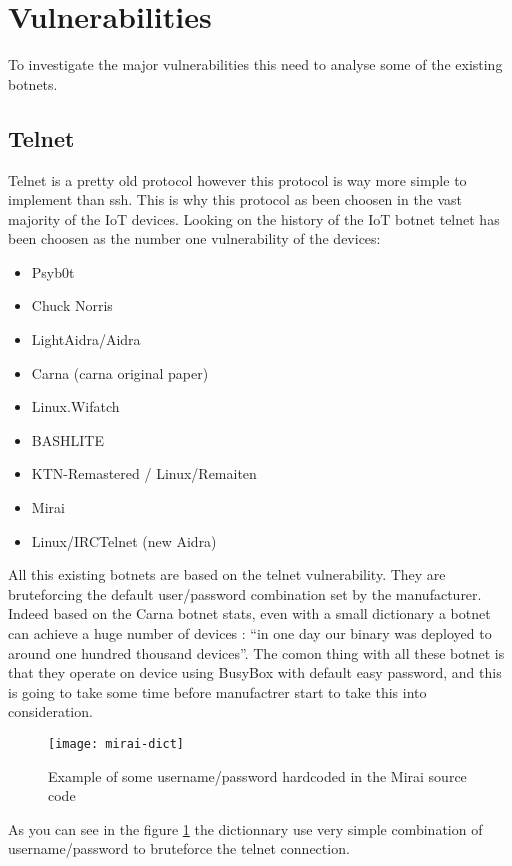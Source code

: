\documentclass{report}
\begin{document}
\section{Vulnerabilities}
To investigate the major vulnerabilities this need to analyse some of the existing botnets.

\subsection{Telnet}
Telnet is a pretty old protocol\autocite{davidson1977arpanet} however this protocol is way more simple to implement than ssh. This is why this protocol as been choosen in the vast majority of the IoT devices. Looking on the history of the IoT botnet telnet has been choosen as the number one vulnerability of the devices:

\begin{itemize}
 \item Psyb0t\autocite{durfina2013psybot}
 \item Chuck Norris\autocite{celeda2010embedded}
 \item LightAidra/Aidra\autocite{aidra}
 \item Carna\autocite{krenc2014internet} (carna original paper\autocite{carna})
 \item Linux.Wifatch\autocite{wifatch}
 \item BASHLITE\autocite{bashlite}
 \item KTN-Remastered / Linux/Remaiten\autocite{remaiten}
 \item Mirai\autocite{kolias2017ddos}
 \item Linux/IRCTelnet (new Aidra)\autocite{irctelnet}
\end{itemize}

All this existing botnets are based on the telnet vulnerability. They are bruteforcing the default user/password combination set by the manufacturer. Indeed based on the Carna botnet\autocite{carna} stats, even with a small dictionary a botnet can achieve a huge number of devices : ``in one day our binary was deployed to around one hundred thousand devices''.
The comon thing with all these botnet is that they operate on device using BusyBox with default easy password, and this is going to take some time before manufactrer start to take this into consideration.\newline
\begin{figure}[h]
 \caption{Example of some username/password hardcoded in the Mirai source code}
 \centering
 \texttt{[image: mirai-dict]}
 \label{fig:mirai-dict}
\end{figure}
As you can see in the figure \ref{fig:mirai-dict} the dictionnary use very simple combination of username/password to bruteforce the telnet connection.
\end{document}
